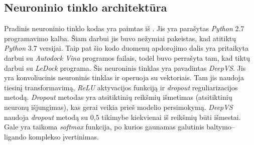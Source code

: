 




\subsection{Neuroninio tinklo architektūra}


Pradinis neuroninio tinklo kodas yra paimtas iš \cite{pereira_boosting_2016}. Jis yra parašytas \emph{Python} 2.7 programavimo kalba. Šiam darbui jis buvo nežymiai pakeistas, kad atitiktų \emph{Python} 3.7 versijai. Taip pat šio kodo duomenų apdorojimo dalis yra pritaikyta darbui su \emph{Autodock Vina} programos failais, todėl buvo perrašyta tam, kad tiktų darbui su \emph{LeDock} programa. Šis neuroninis tinklas yra pavadintas \emph{DeepVS}. Jis yra konvoliucinis neuroninis tinklas ir operuoja su vektoriais. Tam jis naudoja tiesinį transformavimą, \emph{ReLU}  aktyvacijos funkciją ir \emph{dropout} reguliarizacijos metodą. \emph{Dropout} metodas yra atsitiktinių reikšmių išmetimas (atsitiktinių neuronų išjungimas), kas gerai veikia prieš modelio persimokymą. \emph{DeepVS} naudoja \emph{dropout} metodą su 0,5 tikimybe kiekvienai iš reikšmių būti išmestai. Gale yra taikoma \emph{softmax} funkcija, po kurios gaunamas galutinis baltymo--ligando komplekso įvertinimas.

